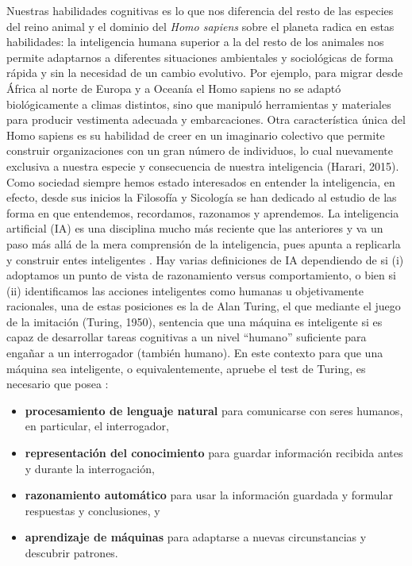 Nuestras habilidades cognitivas es lo que nos diferencia del resto de las especies del reino animal y el dominio del \emph{Homo sapiens} sobre el planeta radica en estas habilidades: la inteligencia humana superior a la del resto de los animales nos permite adaptarnos a diferentes situaciones ambientales y sociológicas de forma rápida y sin la necesidad de un cambio evolutivo. Por ejemplo, para migrar desde África al norte de Europa y a Oceanía el Homo sapiens no se adaptó biológicamente a climas distintos, sino que manipuló herramientas y materiales para producir vestimenta adecuada y embarcaciones. Otra característica única del Homo sapiens es su habilidad de creer en un imaginario colectivo que permite construir organizaciones con un gran número de individuos, lo cual nuevamente exclusiva a nuestra especie y consecuencia de nuestra inteligencia  (Harari, 2015). Como sociedad siempre hemos estado interesados en entender la inteligencia, en efecto, desde sus inicios la Filosofía y Sicología se han dedicado al estudio de las forma en que entendemos, recordamos, razonamos y aprendemos. La inteligencia artificial (IA) es una disciplina mucho más reciente que las anteriores y va un paso más allá de la mera comprensión de la inteligencia, pues apunta a replicarla y construir entes inteligentes . Hay varias definiciones de IA dependiendo de si (i) adoptamos un punto de vista de razonamiento versus comportamiento, o bien si (ii) identificamos las acciones inteligentes como humanas u objetivamente racionales, una de estas posiciones es la de Alan Turing, el que mediante el juego de la imitación (Turing, 1950), sentencia que una máquina es inteligente si es capaz de desarrollar tareas cognitivas a un nivel “humano” suficiente para engañar a un interrogador (también humano). En este contexto para que una máquina sea inteligente, o equivalentemente, apruebe el test de Turing, es necesario que posea :
\begin{itemize}
	\item \textbf{procesamiento de lenguaje natural} para comunicarse con seres humanos, en particular, el interrogador,
	\item \textbf{representación del conocimiento} para guardar información recibida antes y durante la interrogación,
	\item \textbf{razonamiento automático} para usar la información guardada y formular respuestas y conclusiones, y
	\item \textbf{aprendizaje de máquinas} para adaptarse a nuevas circunstancias y descubrir patrones.
\end{itemize}

